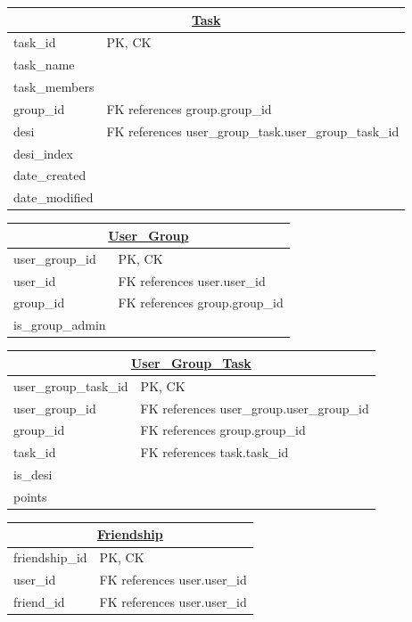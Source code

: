 \documentclass[a4paper]{article}
\begin{document}
\begin{table}[H]
\centering
\begin{tabular}{|l|l|}
\hline
\multicolumn{2}{|c|}{{\ul \textbf{Task}}} \\ \hline
task\_id & PK, CK \\
task\_name &  \\
task\_members &  \\
group\_id & FK references group.group\_id \\
desi & FK references user\_group\_task.user\_group\_task\_id\\
desi\_index &  \\
date\_created &  \\
date\_modified & 
\end{tabular}
\end{table}

\begin{table}[H]
\centering
\begin{tabular}{|l|l|}
\hline
\multicolumn{2}{|c|}{{\ul \textbf{User\_Group}}} \\ \hline
user\_group\_id & PK, CK \\
user\_id & FK references user.user\_id \\
group\_id & FK references group.group\_id \\
is\_group\_admin & 
\end{tabular}
\end{table}

\begin{table}[H]
\centering
\begin{tabular}{|l|l|}
\hline
\multicolumn{2}{|c|}{{\ul \textbf{User\_Group\_Task}}} \\ \hline
user\_group\_task\_id & PK, CK \\
user\_group\_id & FK references user\_group.user\_group\_id \\
group\_id & FK references group.group\_id \\
task\_id & FK references task.task\_id \\
is\_desi &  \\
points & 
\end{tabular}
\end{table}

\begin{table}[H]
\centering
\begin{tabular}{|l|l|}
\hline
\multicolumn{2}{|c|}{{\ul \textbf{Friendship}}} \\ \hline
friendship\_id & PK, CK \\
user\_id & FK references user.user\_id \\
friend\_id & FK references user.user\_id
\end{tabular}
\end{table}
\end{document}

